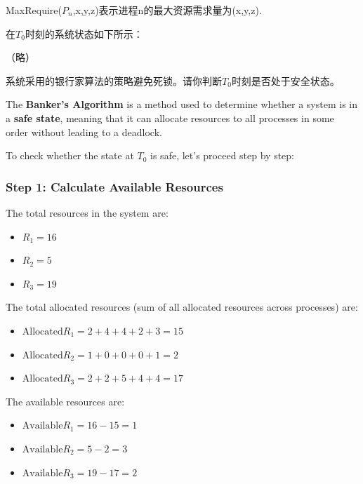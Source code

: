 \documentclass[a4paper]{book}
\begin{document}
MaxRequire(\(P_n\),x,y,z)表示进程n的最大资源需求量为(x,y,z).

在\(T_0\)时刻的系统状态如下所示：

（略）

系统采用的银行家算法的策略避免死锁。请你判断\(T_0\)时刻是否处于安全状态。

The \textbf{Banker's Algorithm} is a method used to determine whether a system is in a \textbf{safe state}, meaning that it can allocate resources to all processes in some order without leading to a deadlock.

To check whether the state at \( T_0 \) is safe, let's proceed step by step:

\hrulefill

\subsubsection{Step 1: Calculate Available Resources}

The total resources in the system are:
\begin{itemize}
\item 
\( R_1 = 16 \)

\item 
\( R_2 = 5 \)

\item 
\( R_3 = 19 \)

\end{itemize}

The total allocated resources (sum of all allocated resources across processes) are:
\begin{itemize}
\item 
\( \text{Allocated} R_1 = 2+4+4+2+3 = 15 \)

\item 
\( \text{Allocated} R_2 = 1+0+0+0+1 = 2 \)

\item 
\( \text{Allocated} R_3 = 2+2+5+4+4 = 17 \)

\end{itemize}

The available resources are:
\begin{itemize}
\item 
\( \text{Available} R_1 = 16 - 15 = 1 \)

\item 
\( \text{Available} R_2 = 5 - 2 = 3 \)

\item 
\( \text{Available} R_3 = 19 - 17 = 2 \)

\end{itemize}
\end{document}

